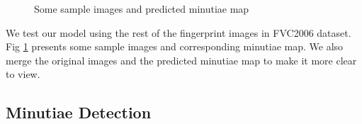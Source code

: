 \begin{figure}[htbp]
\begin{minipage}{0.48\linewidth}
{        }
    \end{minipage}

    \caption{Some sample images and predicted minutiae map}
    \label{fig:minutiae-map}
\end{figure}

We test our model using the rest of the fingerprint images in FVC2006 dataset.
Fig \ref{fig:minutiae-map} presents some sample images and corresponding minutiae map.
We also merge the original images and the predicted minutiae map to make it more clear to view.



\subsection{Minutiae Detection}
